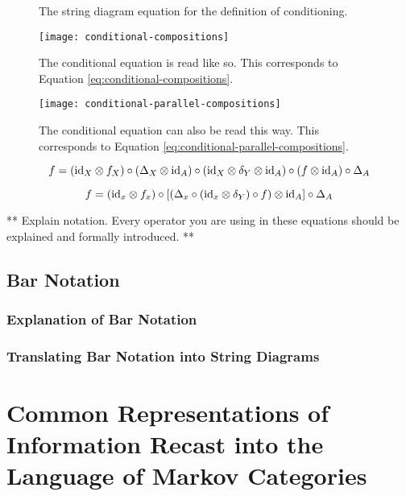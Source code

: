 \begin{figure}[htb]
	\centering
	\caption{The string diagram equation for the definition of conditioning.}
	\label{tikz:conditional}
\end{figure}

\begin{figure}[htb]
	\centering
	\texttt{[image: conditional-compositions]}
	\caption{The conditional equation is read like so. This corresponds to Equation \ref{eq:conditional-compositions}.}
	\label{fig:conditional-compositions}
\end{figure}

\begin{figure}[htb]
	\centering
	\texttt{[image: conditional-parallel-compositions]}
	\caption{The conditional equation can also be read this way. This corresponds to Equation \ref{eq:conditional-parallel-compositions}.}
	\label{fig:conditional-parallel-compositions}
\end{figure}

\begin{equation}
\label{eq:conditional-compositions}
f = (\mathrm{id}_X \otimes f_X) \circ (\Delta_X \otimes \mathrm{id}_A)
\circ (\mathrm{id}_X \otimes \delta_Y \otimes \mathrm{id}_A) \circ (f \otimes \mathrm{id}_A) \circ \Delta_A
\end{equation}

\begin{equation}
\label{eq:conditional-parallel-compositions}
f = (\mathrm{id}_x \otimes f_x) \circ \left[\left(\Delta_x \circ (\mathrm{id}_x\otimes \delta_Y) \circ f\right) \otimes \mathrm{id}_A\right] \circ \Delta_A
\end{equation}

** Explain notation. Every operator you are using in these equations should be explained and formally introduced. **

\section{Bar Notation}
\subsection{Explanation of Bar Notation}
\subsection{Translating Bar Notation into String Diagrams}

\chapter{Common Representations of Information Recast into the Language of Markov Categories}
